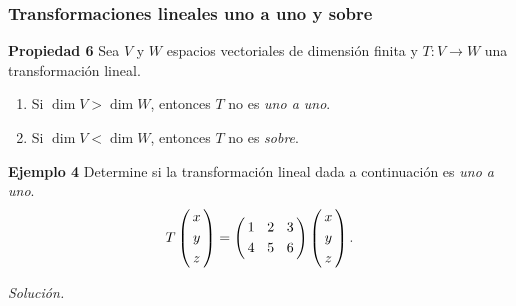 \begin{frame}\frametitle{Transformaciones lineales uno a uno y sobre}

\begin{prop}{\textbf{Propiedad 6}}
	\justifying
	Sea $V$ y $W$ espacios vectoriales de dimensión finita y $T:V\to W$ una transformación lineal. 
	\begin{enumerate}
		\item[\labelname{$a$}] Si $\dim V > \dim W$, entonces $T$ no es \textit{uno a uno}.
		\item[\labelname{$b$}] Si $\dim V < \dim W$, entonces $T$ no es \textit{sobre}.
	\end{enumerate}
\end{prop}	

\begin{ej}{\textbf{Ejemplo 4}}
	\justifying
	Determine si la transformación lineal dada a continuación es \textit{uno a uno}.
	\[
		T
		\left(
		\begin{array}{@{\hspace{0.3\tabcolsep}}c@{\hspace{0.3\tabcolsep}}}
		x  \\[1mm]
		y  \\[1mm]
		z
		\end{array}
		\right)
		=
		\left(
		\begin{array}{@{\hspace{0.3\tabcolsep}}r@{\hspace{1.5\tabcolsep}}r@{\hspace{1.5\tabcolsep}}r@{\hspace{0.3\tabcolsep}}}
		1 & 2 & 3 \\[1mm]
		4 & 5 & 6
		\end{array}
		\right)
		\left(
		\begin{array}{@{\hspace{0.3\tabcolsep}}c@{\hspace{0.3\tabcolsep}}}
		x  \\[1mm]
		y  \\[1mm]
		z
		\end{array}
		\right).
	\]
\end{ej}
\textit{Solución.}

\end{frame}


\subsection{}

